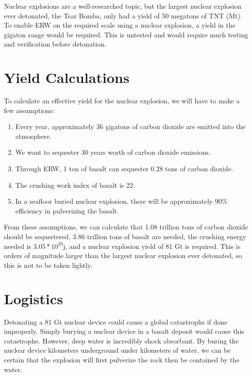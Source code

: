 \documentclass[11pt]{article}
\begin{document}
Nuclear explosions are a well-researched topic, but the largest nuclear
explosion ever detonated, the Tsar Bomba, only had a yield of 50 megatons
of TNT (Mt)\citep{tsar_bomba}. To enable ERW on the required scale using a nuclear explosion,
a yield in the gigaton range would be required. This is untested and would
require much testing and verification before detonation.



\section{Yield Calculations}

To calculate an effective yield for the nuclear explosion, we will have to make a few assumptions:


\begin{enumerate}
    \item Every year, approximately 36 gigatons of carbon dioxide are emitted into the atmosphere.\cite{}
    \item We want to sequester 30 years worth of carbon dioxide emissions.
    \item Through ERW, 1 ton of basalt can sequester 0.28 tons of carbon dioxide\citep{enhanced_rock_weathering}.
    \item The crushing work index of basalt is 22\citep{basalt_crushing_work_index}.
    \item In a seafloor buried nuclear explosion, there will be approximately 90\% efficiency in pulverizing the basalt.
\end{enumerate}


From these assumptions, we can calculate that 1.08 trillion tons of carbon dioxide should be sequestered, 3.86 trillion tons of basalt are needed, the crushing energy needed is $3.05*10^{20}$j, and a nuclear explosion yield of 81 Gt is required. This is orders of magnitude larger than the largest nuclear explosion ever detonated, so this is not to be taken lightly.





\section{Logistics}

Detonating a 81 Gt nuclear device could cause a global catastrophe if done improperly. Simply burying a nuclear device in a basalt deposit would cause this catastrophe. However, deep water is incredibly shock absorbant. By buring the nuclear device kilometers underground under kilometers of water, we can be certain that the explosion will first pulverize the rock then be contained by the water.
\end{document}
